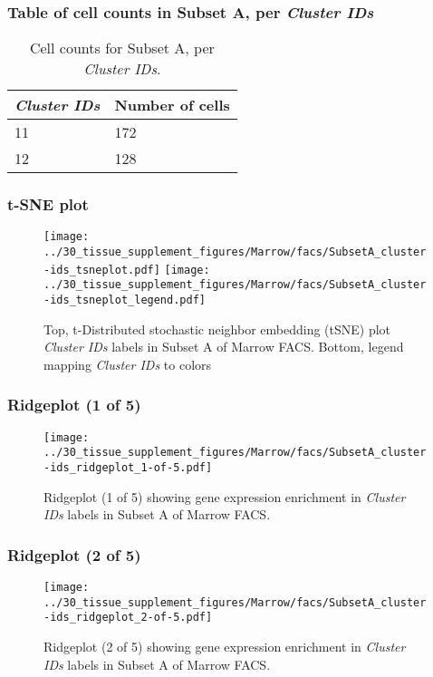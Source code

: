 \subsubsection{Table of cell counts in Subset A, per \emph{Cluster IDs}}\begin{table}[h]
\centering
\label{my-label}
\begin{tabular}{@{}ll@{}}
\toprule

\emph{Cluster IDs}& Number of cells \\ \midrule
11 & 172 \\

12 & 128 \\
\bottomrule
\end{tabular}
\caption{Cell counts for Subset A, per \emph{Cluster IDs}.}
\end{table}

\clearpage
\subsubsection{t-SNE plot}
\begin{figure}[h]
\centering
\texttt{[image: ../30\_tissue\_supplement\_figures/Marrow/facs/SubsetA\_cluster-ids\_tsneplot.pdf]}
\texttt{[image: ../30\_tissue\_supplement\_figures/Marrow/facs/SubsetA\_cluster-ids\_tsneplot\_legend.pdf]}
\caption{Top, t-Distributed stochastic neighbor embedding (tSNE) plot  \emph{Cluster IDs} labels in Subset A of Marrow FACS. Bottom, legend mapping \emph{Cluster IDs} to colors}
\end{figure}


\clearpage

\subsubsection{Ridgeplot (1 of 5)}
\begin{figure}[h]
\centering
\texttt{[image: ../30\_tissue\_supplement\_figures/Marrow/facs/SubsetA\_cluster-ids\_ridgeplot\_1-of-5.pdf]}

\caption{ Ridgeplot (1 of 5)  showing gene expression enrichment in \emph{Cluster IDs} labels in Subset A of Marrow FACS. }
\end{figure}


\clearpage

\subsubsection{Ridgeplot (2 of 5)}
\begin{figure}[h]
\centering
\texttt{[image: ../30\_tissue\_supplement\_figures/Marrow/facs/SubsetA\_cluster-ids\_ridgeplot\_2-of-5.pdf]}

\caption{ Ridgeplot (2 of 5)  showing gene expression enrichment in \emph{Cluster IDs} labels in Subset A of Marrow FACS. }
\end{figure}



